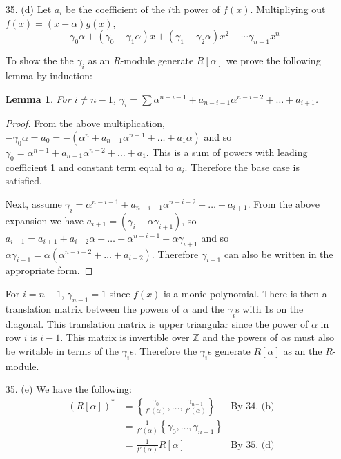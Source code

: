 \documentclass{article}
\newcommand{\Z}[0]{\mathbb{Z}}
\newtheorem{lemma}{Lemma}
\begin{document}
\begin{enumerate}
\item[35. (d)]
Let $a_i$ be the coefficient of the $i$th power of $f(x)$.  Multipliying out $f(x) = (x - \alpha)g(x)$, \[ -\gamma_0\alpha + (\gamma_0 - \gamma_1 \alpha)x + (\gamma_1 - \gamma_2 \alpha)x^2 + \cdots \gamma_{n-1}x^n \]

To show the the $\gamma_i$ as an $R$-module generate $R[\alpha]$ we prove the following lemma by induction:

\begin{lemma}
     For $i \neq n - 1$, $\gamma_i = \sum \alpha^{n - i - 1} + a_{n - i - 1} \alpha^{n - i - 2} + \ldots + a_{i + 1}$.
\end{lemma}
\begin{proof}
From the above multiplication, $-\gamma_0\alpha = a_0 = -(\alpha^n + a_{n-1} \alpha^{n-1} + \ldots + a_1 \alpha)$ and so $\gamma_0 = \alpha^{n-1} + a_{n-1} \alpha^{n-2} + \ldots + a_1$.  This is a sum of powers with leading coefficient 1 and constant term equal to $a_{i}$.  Therefore the base case is satisfied.

Next, assume $\gamma_i = \alpha^{n - i - 1} + a_{n - i - 1}\alpha^{n - i - 2} + \ldots + a_{i + 1}$. From the above expansion we have $a_{i + 1} = (\gamma_{i} - \alpha\gamma_{i + 1})$, so $a_{i + 1} = a_{i + 1} + a_{i + 2}\alpha + \ldots + \alpha^{n - i - 1} - \alpha\gamma_{i + 1}$ and so $\alpha\gamma_{i + 1} = \alpha(\alpha^{n - i - 2} + \ldots + a_{i + 2})$.  Therefore $\gamma_{i + 1}$ can also be written in the appropriate form.
\end{proof}

For $i = n - 1$, $\gamma_{n-1} = 1$ since $f(x)$ is a monic polynomial.   There is then a translation matrix between the powers of $\alpha$ and the $\gamma_i$s with 1s on the diagonal.  This translation matrix is upper triangular since the power of $\alpha$ in row $i$ is $i - 1$.  This matrix is invertible over $\Z$ and the powers of $\alpha$s must also be writable in terms of the $\gamma_i$s.  Therefore the $\gamma_i$s generate $R[\alpha]$ as an the $R$-module.

\item[35. (e)] We have the following: \begin{align*}(R[\alpha])^{*} &= \left\{ \frac{\gamma_0}{f'(\alpha)}, \ldots, \frac{\gamma_{n-1}}{f'(\alpha)}\right\} & \text{By 34. (b)} \\ &= \frac{1}{f'(\alpha)}\left\{ \gamma_0, \ldots, \gamma_{n-1}\right\}\\ &= \frac{1}{f'(\alpha)}R[\alpha] & \text{By 35. (d)} \end{align*}


\end{enumerate}
\end{document}
